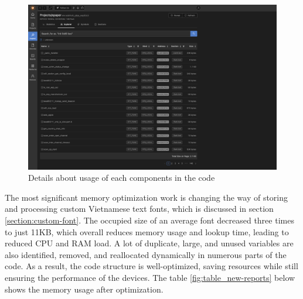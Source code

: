 \documentclass[../Main.tex]{subfiles}
\begin{document}
\begin{figure}[H]
    \centering
    \includegraphics[width=0.95\linewidth]{doc//imgs/platformio-debug.png}
    \caption{Details about usage of each components in the code}
    \label{fig:platformio-debug}
\end{figure}

The most significant memory optimization work is changing the way of storing and processing custom Vietnamese text fonts, which is discussed in section \ref{section:custom-font}. The occupied size of an average font decreased three times to just 11KB, which overall reduces memory usage and lookup time, leading to reduced CPU and RAM load. A lot of duplicate, large, and unused variables are also identified, removed, and reallocated dynamically in numerous parts of the code. As a result, the code structure is well-optimized, saving resources while still ensuring the performance of the devices. The table \ref{fig:table_new-reports} below shows the memory usage after optimization.
\end{document}
